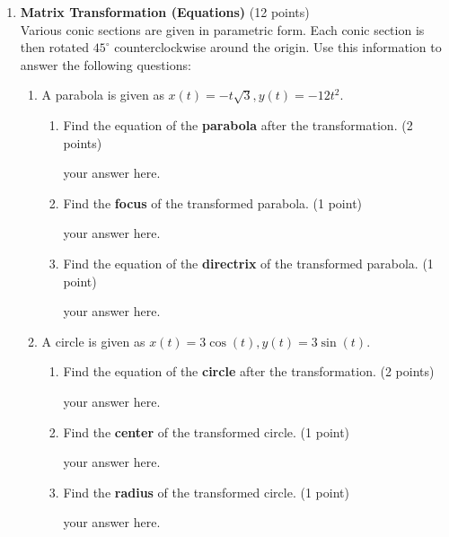 \begin{enumerate}
  \newpage

  \item \textbf{Matrix Transformation (Equations)} (12 points)\\
  Various conic sections are given in parametric form. Each conic section is then 
  rotated $45^{\circ}$ counterclockwise around the origin. Use this information to 
  answer the following questions:
  \begin{enumerate}
    \item A parabola is given as $x(t)=-t \sqrt{3}, y(t)=-12 t^2$.
    \begin{enumerate}
      \item Find the equation of the \textbf{parabola} after the transformation. (2 points)
      \begin{subanswer}
        your answer here.
      \end{subanswer}
      \item Find the \textbf{focus} of the transformed parabola. (1 point)
      \begin{subanswer}
        your answer here.
      \end{subanswer}
      \item Find the equation of the \textbf{directrix} of the transformed parabola. (1 point)
      \begin{subanswer}
        your answer here.
      \end{subanswer}
    \end{enumerate}

    \item A circle is given as $x(t)=3\cos(t), y(t)=3\sin(t)$.
    \begin{enumerate}
      \item Find the equation of the \textbf{circle} after the transformation. (2 points)
      \begin{subanswer}
        your answer here.
      \end{subanswer}
      \item Find the \textbf{center} of the transformed circle. (1 point)
      \begin{subanswer}
        your answer here.
      \end{subanswer}
      \item Find the \textbf{radius} of the transformed circle. (1 point)
      \begin{subanswer}
        your answer here.
      \end{subanswer}
    \end{enumerate}


\end{enumerate}
\end{enumerate}
